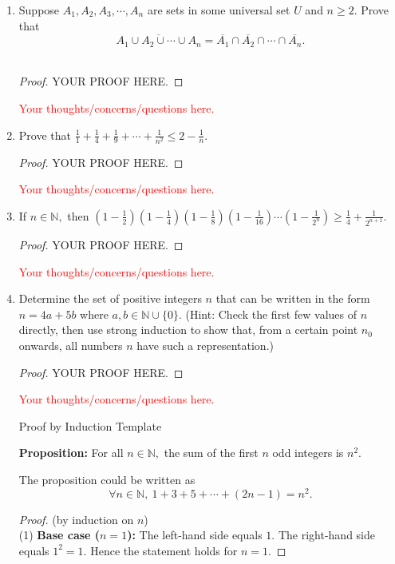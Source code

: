 \documentclass[11pt]{report}
\theoremstyle{plain}
\newcommand{\N}{\mathbb{N}}
\begin{document}
\begin{enumerate}
\item[\textbf{18.}] Suppose $A_1, A_2, A_3, \cdots, A_n$ are sets in some universal set $U$ and $n \geq 2.$ Prove that $$\overline{A_1 \cup A_2 \cup \cdots \cup A_n}=\overline{A_1}\cap\overline{A_2}\cap \cdots \cap \overline{A_n}.$$\\
\begin{proof} YOUR PROOF HERE.
\end{proof}
\textcolor{red}{Your thoughts/concerns/questions here.}
\vspace{1in}
\item[\textbf{19.}] Prove that $\frac{1}{1}+\frac{1}{4}+\frac{1}{9}+\cdots+\frac{1}{n^2}\leq 2-\frac{1}{n}.$ \\
\begin{proof} YOUR PROOF HERE.
\end{proof}
\textcolor{red}{Your thoughts/concerns/questions here.}
\vspace{1in}
\item[\textbf{22.}] If $n \in \N,$ then $\left(1-\frac{1}{2} \right)\left(1-\frac{1}{4} \right)\left(1-\frac{1}{8} \right)\left(1-\frac{1}{16} \right)\cdots\left(1-\frac{1}{2^n} \right)\geq \frac{1}{4}+\frac{1}{2^{n+1}}.$\\
\begin{proof} YOUR PROOF HERE.
\end{proof}
\textcolor{red}{Your thoughts/concerns/questions here.}
\vspace{1in}
\item[\textbf{Problem A:} ] Determine the set of positive integers $n$ that can be written in the form $n = 4a+ 5b$ where $a,b \in \N \cup \{0\}.$ (Hint: Check the first few values of $n$ directly,
then use strong induction to show that, from a certain point $n_0$ onwards, all numbers $n$ have such a
representation.)
\begin{proof} YOUR PROOF HERE.
\end{proof}
\textcolor{red}{Your thoughts/concerns/questions here.}
\vspace{1in}

\hrulefill
\begin{center} Proof by Induction Template \end{center}
\textbf{Proposition:} For all $n \in \N,$ the sum of the first $n$ odd integers is $n^2.$

The proposition could be written as 
$$\forall n \in \N, \: 1+3+ 5+\cdots + (2n-1) = n^2.$$
\begin{proof} (by induction on $n$)\\
\medskip\noindent(1) \textbf{Base case ($n=1$):}
The left-hand side equals $1.$ The right-hand side equals $1^2=1$.
Hence the statement holds for $n=1$.


\end{proof}
\end{enumerate}
\end{document}
